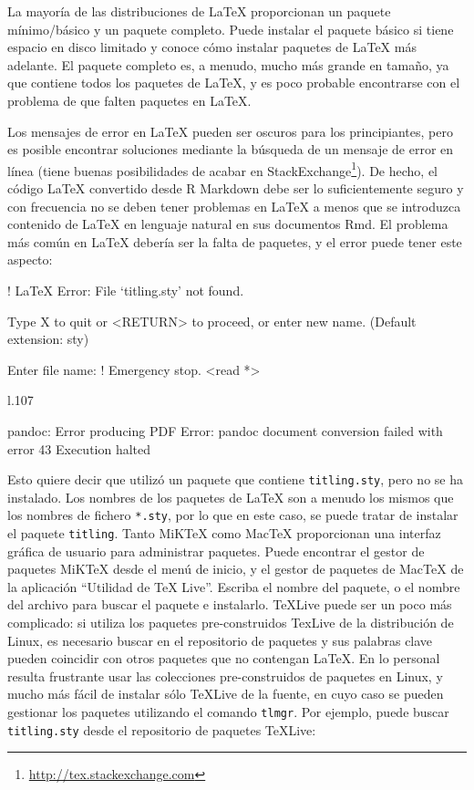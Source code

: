 \documentclass[12pt,]{krantz}
\makeatletter
\newenvironment{Shaded}{\begin{snugshade}}{\end{snugshade}}
\newcommand{\NormalTok}[1]{{#1}}
\renewcommand{\href}[2]{#2\footnote{\url{#1}}}
\newenvironment{kframe}{%
\medskip{}
\setlength{\fboxsep}{.8em}
 \def\at@end@of@kframe{}%
 \ifinner\ifhmode%
  \def\at@end@of@kframe{\end{minipage}}%
  \begin{minipage}{\columnwidth}%
 \fi\fi%
 \def\FrameCommand##1{\hskip\@totalleftmargin \hskip-\fboxsep
 \colorbox{shadecolor}{##1}\hskip-\fboxsep
     \hskip-\linewidth \hskip-\@totalleftmargin \hskip\columnwidth}%
 \MakeFramed {\advance\hsize-\width
   \@totalleftmargin\z@ \linewidth\hsize
   \@setminipage}}%
 {\par\unskip\endMakeFramed%
 \at@end@of@kframe}
\renewenvironment{Shaded}{\begin{kframe}}{\end{kframe}}
\theoremstyle{definition}
\theoremstyle{definition}
\theoremstyle{remark}
\makeatother
\begin{document}
La mayoría de las distribuciones de LaTeX proporcionan un paquete
mínimo/básico y un paquete completo. Puede instalar el paquete básico si
tiene espacio en disco limitado y conoce cómo instalar paquetes de LaTeX
más adelante. El paquete completo es, a menudo, mucho más grande en
tamaño, ya que contiene todos los paquetes de LaTeX, y es poco probable
encontrarse con el problema de que falten paquetes en LaTeX.

Los mensajes de error en LaTeX pueden ser oscuros para los
principiantes, pero es posible encontrar soluciones mediante la búsqueda
de un mensaje de error en línea (tiene buenas posibilidades de acabar en
\href{http://tex.stackexchange.com}{StackExchange}). De hecho, el código
LaTeX convertido desde R Markdown debe ser lo suficientemente seguro y
con frecuencia no se deben tener problemas en LaTeX a menos que se
introduzca contenido de LaTeX en lenguaje natural en sus documentos Rmd.
El problema más común en LaTeX debería ser la falta de paquetes, y el
error puede tener este aspecto:

\begin{Shaded}
\begin{Highlighting}[]
\NormalTok{! LaTeX Error: File `titling.sty' not found.}

\NormalTok{Type X to quit or <RETURN> to proceed,}
\NormalTok{or enter new name. (Default extension: sty)}

\NormalTok{Enter file name: }
\NormalTok{! Emergency stop.}
\NormalTok{<read *> }
         
\NormalTok{l.107 ^^M}

\NormalTok{pandoc: Error producing PDF}
\NormalTok{Error: pandoc document conversion failed with error 43}
\NormalTok{Execution halted}
\end{Highlighting}
\end{Shaded}

Esto quiere decir que utilizó un paquete que contiene
\texttt{titling.sty}, pero no se ha instalado. Los nombres de los
paquetes de LaTeX son a menudo los mismos que los nombres de fichero
\texttt{*.sty}, por lo que en este caso, se puede tratar de instalar el
paquete \texttt{titling}. Tanto MiKTeX como MacTeX proporcionan una
interfaz gráfica de usuario para administrar paquetes. Puede encontrar
el gestor de paquetes MiKTeX desde el menú de inicio, y el gestor de
paquetes de MacTeX de la aplicación ``Utilidad de TeX Live''. Escriba el
nombre del paquete, o el nombre del archivo para buscar el paquete e
instalarlo. TeXLive puede ser un poco más complicado: si utiliza los
paquetes pre-construidos TexLive de la distribución de Linux, es
necesario buscar en el repositorio de paquetes y sus palabras clave
pueden coincidir con otros paquetes que no contengan LaTeX. En lo
personal resulta frustrante usar las colecciones pre-construidos de
paquetes en Linux, y mucho más fácil de instalar sólo TeXLive de la
fuente, en cuyo caso se pueden gestionar los paquetes utilizando el
comando \texttt{tlmgr}. Por ejemplo, puede buscar \texttt{titling.sty}
desde el repositorio de paquetes TeXLive:
\end{document}
